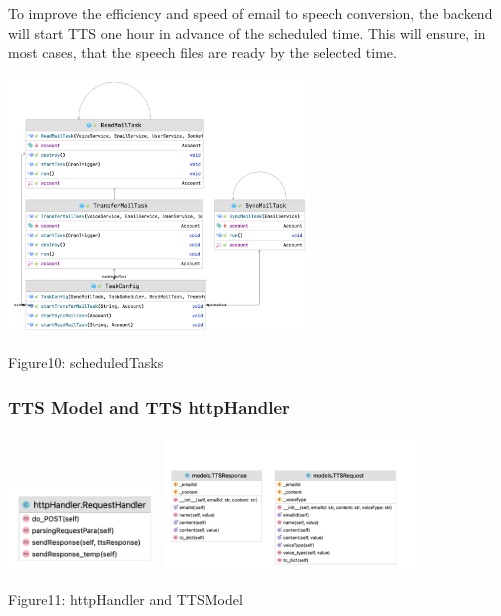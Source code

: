 \documentclass{article}
\begin{document}
To improve the efficiency and speed of email to speech conversion, the backend will start TTS one hour in advance of the scheduled time. This will ensure, in most cases, that the speech files are ready by the selected time.
\begin{center}
    \includegraphics[width=0.6\textwidth]{scheduledTasks.png}
\end{center}
\begin{center}
Figure10: scheduledTasks
\end{center}
\subsubsection{TTS Model and TTS httpHandler}
\includegraphics[width=0.3\textwidth]{httpHandler.png}
\includegraphics[width=0.5\textwidth]{TTSModel.png}
\begin{center}
Figure11: httpHandler and TTSModel
\end{center}
\end{document}

